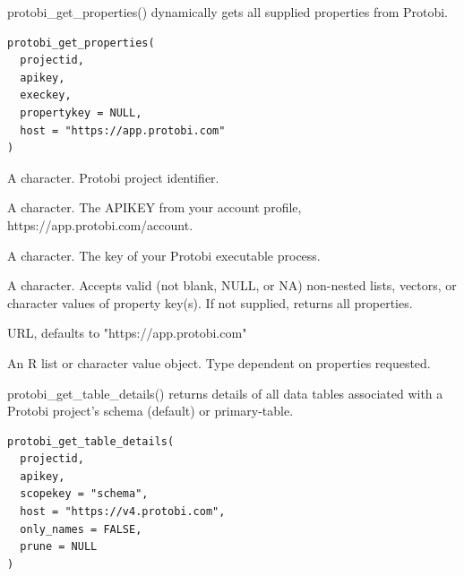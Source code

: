 \documentclass[a4paper]{book}
\begin{document}
%
\begin{Description}\relax
protobi\_get\_properties() dynamically gets all supplied properties from Protobi.
\end{Description}
%
\begin{Usage}
\begin{verbatim}
protobi_get_properties(
  projectid,
  apikey,
  execkey,
  propertykey = NULL,
  host = "https://app.protobi.com"
)
\end{verbatim}
\end{Usage}
%
\begin{Arguments}
\begin{ldescription}
\item[\code{projectid}] A character. Protobi project identifier.

\item[\code{apikey}] A character. The APIKEY from your account profile, https://app.protobi.com/account.

\item[\code{execkey}] A character. The key of your Protobi executable process.

\item[\code{propertykey}] A character. Accepts valid (not blank, NULL, or NA) non-nested lists, vectors, or character values of property key(s). If not supplied, returns all properties.

\item[\code{host}] URL, defaults to "https://app.protobi.com"
\end{ldescription}
\end{Arguments}
%
\begin{Value}
An R list or character value object. Type dependent on properties requested.
\end{Value}
%
\begin{SeeAlso}
\end{SeeAlso}
%
\begin{Description}\relax
protobi\_get\_table\_details() returns details of all data tables associated with a Protobi project's schema (default) or primary-table.
\end{Description}
%
\begin{Usage}
\begin{verbatim}
protobi_get_table_details(
  projectid,
  apikey,
  scopekey = "schema",
  host = "https://v4.protobi.com",
  only_names = FALSE,
  prune = NULL
)
\end{verbatim}
\end{Usage}
\end{document}

